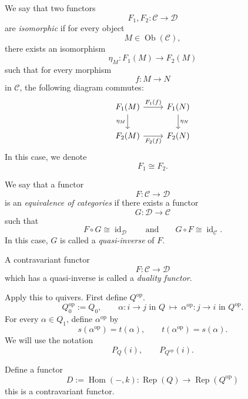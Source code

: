 \documentclass[11pt, a4paper]{report}
\begin{document}
\begin{definition}
    We say that two functors
    \[
    F_1, F_2 : \mathcal{C} \to \mathcal{D}
    \]
    are \emph{isomorphic} if for every object
    \[
    M \in \operatorname{Ob}(\mathcal{C}),
    \]
    there exists an isomorphism
    \[
    \eta_M : F_1(M) \to F_2(M)
    \]
    such that for every morphism
    \[
    f : M \to N
    \]
    in \(\mathcal{C}\), the following diagram commutes:
    \[
    \begin{tikzcd}
    F_1(M) \arrow[r, "F_1(f)"] \arrow[d, "\eta_M"']
    & F_1(N) \arrow[d, "\eta_N"] \\
    F_2(M) \arrow[r, "F_2(f)"']
    & F_2(N)
    \end{tikzcd}
    \]
    In this case, we denote
    \[
    F_1 \cong F_2.
    \]
    \end{definition}

    \begin{definition}
        We say that a functor
        \[
        F:\mathcal{C}\to\mathcal{D}
        \]
        is an \emph{equivalence of categories} if there exists a functor
        \[
        G:\mathcal{D}\to\mathcal{C}
        \]
        such that
        \[
        F\circ G \cong \operatorname{id}_{\mathcal{D}}
        \qquad\text{and}\qquad
        G\circ F \cong \operatorname{id}_{\mathcal{C}}.
        \]
        In this case, \(G\) is called a \emph{quasi-inverse} of \(F\).
        \end{definition}

        \begin{definition}
            A contravariant functor
            \[
            F:\mathcal{C}\to\mathcal{D}
            \]
            which has a quasi-inverse is called a \emph{duality functor}.
    \end{definition}

    Apply this to quivers. First define \(Q^{\operatorname{op}}\).
    \[
    Q_0^{\operatorname{op}} := Q_0,
    \qquad
    \alpha : i \to j \text{ in } Q
    \ \mapsto\
    \alpha^{\operatorname{op}} : j \to i \text{ in } Q^{\operatorname{op}}.
    \]
    For every \(\alpha \in Q_1\), define \(\alpha^{\operatorname{op}}\) by
    \[
    s(\alpha^{\operatorname{op}})=t(\alpha),
    \qquad
    t(\alpha^{\operatorname{op}})=s(\alpha).
    \]
    We will use the notation
    \[
    P_Q(i), \qquad P_{Q^{\operatorname{op}}}(i).
    \]

    Define a functor
    \[
    D := \operatorname{Hom}(-,k)
    :\operatorname{Rep}(Q)\to \operatorname{Rep}(Q^{\operatorname{op}})
    \]
    this is a contravariant functor.
\end{document}
